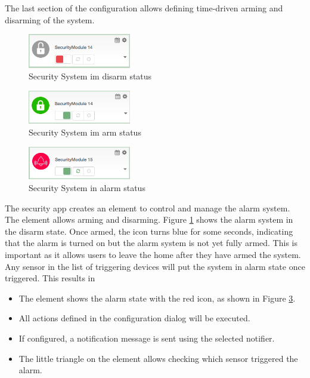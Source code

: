 The last section of the configuration allows defining time-driven arming and disarming of the system.

\begin{figure}
\begin{center}
\includegraphics[width=0.4\textwidth]{pngs/cap6/app23.png}
\caption{Security System im disarm status}
\label{app23}
\end{center}
\end{figure}

\begin{figure}
\begin{center}
\includegraphics[width=0.4\textwidth]{pngs/cap6/app24.png}
\caption{Security System im arm status}
\label{app24}
\end{center}
\end{figure}


\begin{figure}
\begin{center}
\includegraphics[width=0.4\textwidth]{pngs/cap6/app25.png}
\caption{Security System in alarm status}
\label{app25}
\end{center}
\end{figure}

The security app creates an element to control and manage the alarm system. The element 
allows arming and disarming. Figure \ref{app23} shows the alarm system in the disarm state.
 Once armed, the icon turns blue for some seconds, indicating that the alarm is turned on 
 but the alarm system is not yet fully armed. This is important as it allows users to 
 leave the home after they have armed the system.
Any sensor in the list of triggering devices will put the system in alarm state once 
triggered. This results in

\begin{itemize}
\item The element shows the alarm state with the red icon, as shown in Figure \ref{app25}.
\item All actions defined in the configuration dialog will be executed.
\item If configured, a notification message is sent using the selected notifier.
\item The little triangle on the element allows checking which sensor triggered the alarm.
\end{itemize}

